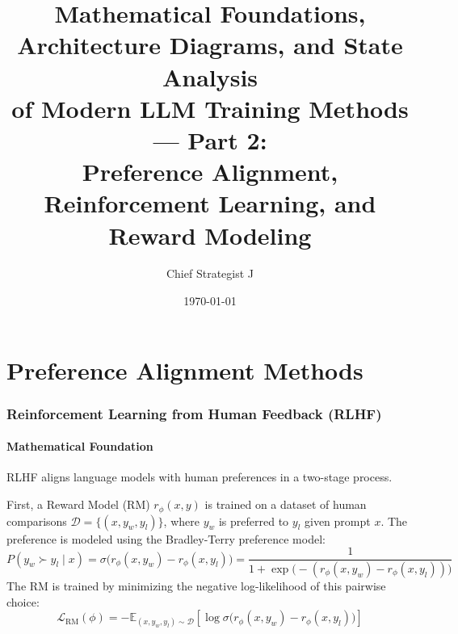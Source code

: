\documentclass{article}
\begin{document}
\title{\textbf{Mathematical Foundations, Architecture Diagrams, and State Analysis\\
of Modern LLM Training Methods --- Part 2:\\
Preference Alignment, Reinforcement Learning, and Reward Modeling}}
\author{Chief Strategist J}
\date{\today}
\maketitle
\tableofcontents
\newpage

\part{Preference Alignment Methods}

\section{Reinforcement Learning from Human Feedback (RLHF)}

\subsection{Mathematical Foundation}
RLHF aligns language models with human preferences in a two-stage process. 

First, a Reward Model (RM) $r_\phi(x, y)$ is trained on a dataset of human comparisons $\mathcal{D} = \{(x, y_w, y_l)\}$, where $y_w$ is preferred to $y_l$ given prompt $x$. The preference is modeled using the Bradley-Terry preference model:
\begin{equation}
  P(y_w \succ y_l \mid x) = \sigma\bigl( r_\phi(x, y_w) - r_\phi(x, y_l) \bigr) = \frac{1}{1 + \exp\bigl( - (r_\phi(x, y_w) - r_\phi(x, y_l)) \bigr)}
\end{equation}
The RM is trained by minimizing the negative log-likelihood of this pairwise choice:
\begin{equation}
  \mathcal{L}_{\text{RM}}(\phi) = -\mathbb{E}_{(x, y_w, y_l) \sim \mathcal{D}} \left[ \log \sigma \bigl( r_\phi(x, y_w) - r_\phi(x, y_l) \bigr) \right]
\end{equation}
\end{document}
